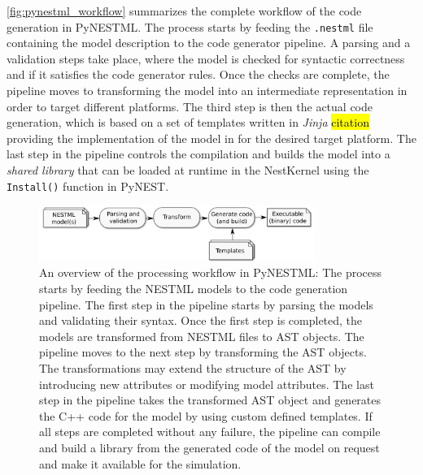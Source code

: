 \autoref{fig:pynestml_workflow} summarizes the complete workflow of the code generation in PyNESTML. The process starts by feeding the \texttt{.nestml} file containing the model description to the code generator pipeline. A parsing and a validation steps take place, where the model is checked for syntactic correctness and if it satisfies the code generator rules. Once the checks are complete, the pipeline moves to transforming the model into an intermediate representation in order to target different platforms. The third step is then the actual code generation, which is based on a set of templates written in \emph{Jinja} \hl {citation} providing the implementation of the model in for the desired target platform. The last step in the pipeline controls the compilation and builds the model into a \emph{shared library} that can be loaded at runtime in the NestKernel using the \texttt{Install()} function in PyNEST.

\begin{figure}[ht!]
\centering
\includegraphics[width=0.8\textwidth]{src/pic/internal_workflow.png}
\caption{An overview of the processing workflow in PyNESTML: The process starts by feeding the NESTML models to the code generation pipeline. The first step in the pipeline starts by parsing the models and validating their syntax. Once the first step is completed, the models are transformed from NESTML files to AST objects. The pipeline moves to the next step by transforming the AST objects. The transformations may extend the structure of the AST by introducing new attributes or modifying model attributes. The last step in the pipeline takes the transformed AST object and generates the C++ code for the model by using custom defined templates. If all steps are completed without any failure, the pipeline can compile and build a library from the generated code of the model on request and make it available for the simulation.}
\label{fig:pynestml_workflow}
\end{figure}
